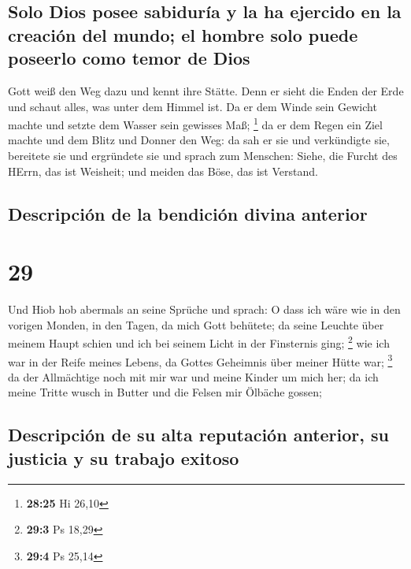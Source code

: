\hypertarget{solo-dios-posee-sabiduruxeda-y-la-ha-ejercido-en-la-creaciuxf3n-del-mundo-el-hombre-solo-puede-poseerlo-como-temor-de-dios}{%
\subsection{Solo Dios posee sabiduría y la ha ejercido en la creación
del mundo; el hombre solo puede poseerlo como temor de
Dios}\label{solo-dios-posee-sabiduruxeda-y-la-ha-ejercido-en-la-creaciuxf3n-del-mundo-el-hombre-solo-puede-poseerlo-como-temor-de-dios}}

 Gott weiß den Weg dazu und kennt ihre Stätte.
 Denn er sieht die Enden der Erde und schaut alles, was
unter dem Himmel ist.  Da er dem Winde sein Gewicht
machte und setzte dem Wasser sein gewisses Maß; \footnote{\textbf{28:25}
  Hi 26,10}  da er dem Regen ein Ziel machte und dem
Blitz und Donner den Weg:  da sah er sie und verkündigte
sie, bereitete sie und ergründete sie  und sprach zum
Menschen: Siehe, die Furcht des HErrn, das ist Weisheit; und meiden das
Böse, das ist Verstand.

\hypertarget{descripciuxf3n-de-la-bendiciuxf3n-divina-anterior}{%
\subsection{Descripción de la bendición divina
anterior}\label{descripciuxf3n-de-la-bendiciuxf3n-divina-anterior}}

\hypertarget{section-28}{%
\section{29}\label{section-28}}

 Und Hiob hob abermals an seine Sprüche und sprach:
 O dass ich wäre wie in den vorigen Monden, in den Tagen,
da mich Gott behütete;  da seine Leuchte über meinem Haupt
schien und ich bei seinem Licht in der Finsternis ging; \footnote{\textbf{29:3}
  Ps 18,29}  wie ich war in der Reife meines Lebens, da
Gottes Geheimnis über meiner Hütte war; \footnote{\textbf{29:4} Ps 25,14}
 da der Allmächtige noch mit mir war und meine Kinder um
mich her;  da ich meine Tritte wusch in Butter und die
Felsen mir Ölbäche gossen;

\hypertarget{descripciuxf3n-de-su-alta-reputaciuxf3n-anterior-su-justicia-y-su-trabajo-exitoso}{%
\subsection{Descripción de su alta reputación anterior, su justicia y su
trabajo
exitoso}\label{descripciuxf3n-de-su-alta-reputaciuxf3n-anterior-su-justicia-y-su-trabajo-exitoso}}

